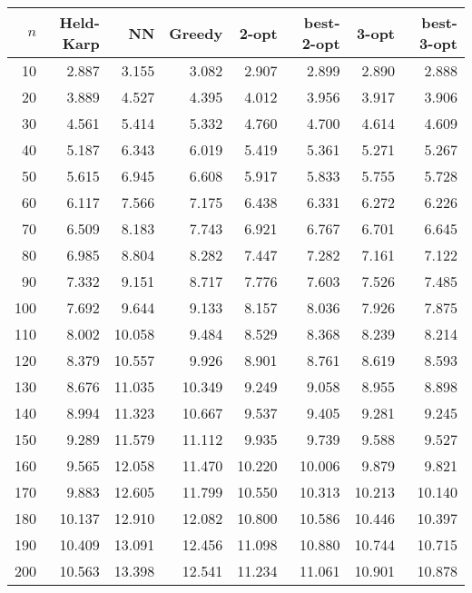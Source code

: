 \documentclass{article}
\begin{document}
\begin{tabular}{|rrrrrrrr|}
\hline
$n$ & Held-Karp & NN & Greedy & 2-opt & best-2-opt & 3-opt & best-3-opt \\
\hline
10 & 2.887 & 3.155 & 3.082 & 2.907 & 2.899 & 2.890 & 2.888 \\
20 & 3.889 & 4.527 & 4.395 & 4.012 & 3.956 & 3.917 & 3.906 \\
30 & 4.561 & 5.414 & 5.332 & 4.760 & 4.700 & 4.614 & 4.609 \\
40 & 5.187 & 6.343 & 6.019 & 5.419 & 5.361 & 5.271 & 5.267 \\
50 & 5.615 & 6.945 & 6.608 & 5.917 & 5.833 & 5.755 & 5.728 \\
60 & 6.117 & 7.566 & 7.175 & 6.438 & 6.331 & 6.272 & 6.226 \\
70 & 6.509 & 8.183 & 7.743 & 6.921 & 6.767 & 6.701 & 6.645 \\
80 & 6.985 & 8.804 & 8.282 & 7.447 & 7.282 & 7.161 & 7.122 \\
90 & 7.332 & 9.151 & 8.717 & 7.776 & 7.603 & 7.526 & 7.485 \\
100 & 7.692 & 9.644 & 9.133 & 8.157 & 8.036 & 7.926 & 7.875 \\
110 & 8.002 & 10.058 & 9.484 & 8.529 & 8.368 & 8.239 & 8.214 \\
120 & 8.379 & 10.557 & 9.926 & 8.901 & 8.761 & 8.619 & 8.593 \\
130 & 8.676 & 11.035 & 10.349 & 9.249 & 9.058 & 8.955 & 8.898 \\
140 & 8.994 & 11.323 & 10.667 & 9.537 & 9.405 & 9.281 & 9.245 \\
150 & 9.289 & 11.579 & 11.112 & 9.935 & 9.739 & 9.588 & 9.527 \\
160 & 9.565 & 12.058 & 11.470 & 10.220 & 10.006 & 9.879 & 9.821 \\
170 & 9.883 & 12.605 & 11.799 & 10.550 & 10.313 & 10.213 & 10.140 \\
180 & 10.137 & 12.910 & 12.082 & 10.800 & 10.586 & 10.446 & 10.397 \\
190 & 10.409 & 13.091 & 12.456 & 11.098 & 10.880 & 10.744 & 10.715 \\
200 & 10.563 & 13.398 & 12.541 & 11.234 & 11.061 & 10.901 & 10.878 \\
\hline
\end{tabular}
\end{document}
